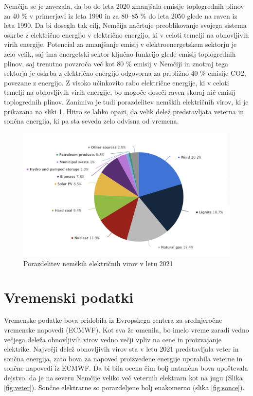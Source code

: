 \documentclass[12pt,a4paper]{amsart}
\theoremstyle{definition} %
\theoremstyle{plain} %
\begin{document}
{Nemčija se je zavezala, da bo do leta 2020 zmanjšala emisije toplogrednih plinov za 40 \% v primerjavi iz leta 1990 in za 80–85 \% do leta 2050 glede na raven iz leta 1990. Da bi dosegla tak cilj, Nemčija načrtuje preoblikovanje svojega sistema oskrbe z električno energijo v električno energijo, ki v celoti temelji na obnovljivih virih energije. Potencial za zmanjšanje emisij v elektroenergetskem sektorju je zelo velik, saj ima energetski sektor ključno funkcijo glede emisij toplogrednih plinov, saj trenutno povzroča več kot 80 \% emisij v Nemčiji in znotraj tega sektorja je oskrba z električno energijo odgovorna za približno 40 \% emisije CO2, povezane z energijo. Z visoko učinkovito rabo električne energije, ki v celoti temelji na obnovljivih virih energije, bo mogoče doseči raven skoraj nič emisij toplogrednih plinov.
Zanimiva je tudi porazdelitev nemških električnih virov, ki je prikazana na sliki \ref{fig:distribution}. Hitro se lahko opazi, da velik delež predstavljata veterna in sončna energija, ki pa sta seveda zelo odvisna od vremena.


\begin{figure}[h]
    \centering
    \includegraphics[scale=0.5]{porazdelitev_germany_2021.png}
    \caption{Porazdelitev nemških električnih virov v letu 2021}
    \label{fig:distribution}
\end{figure}


\section*{Vremenski podatki}

Vremenske podatke bova pridobila iz Evropskega centera za srednjeročne vremenske napovedi (ECMWF). Kot sva že omenila, bo imelo vreme zaradi vedno večjega deleža obnovljivih virov vedno večji vpliv na cene in proizvajanje elektrike. 
Največji delež obnovljivih virov sta v letu 2021 predstavljala veter in sončna energija, zato bova za napoved proizvedene energije uporabila veterne in sončne napovedi iz ECMWF. Da bi bila ocena čim bolj natančna bova upoštevala dejstvo, da je na severu Nemčije veliko več veternih elektrarn kot na jugu (Slika \ref{fig:veter}).  
Sončne elektrarne so porazdeljene bolj enakomerno (slika \ref{fig:sonce}).


}
\end{document}
